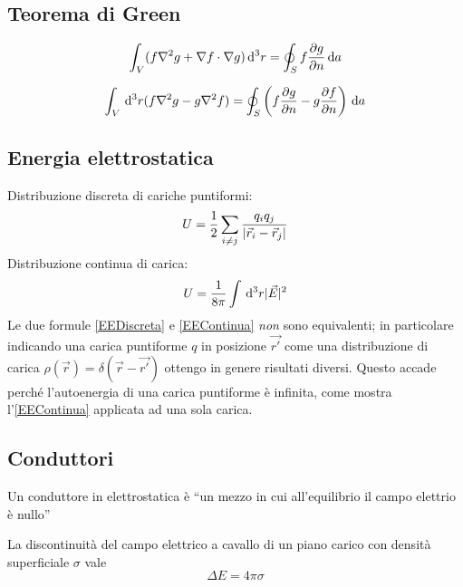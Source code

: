 \documentclass[../main.tex]{subfiles}
\begin{document}
\subsection{Teorema di Green}\label{Green}
\begin{theorem}
  \label{Green1}
  \begin{equation}
  \int_V (f \nabla^2 g + \nabla f \cdot \nabla g) \,\mathrm d^3 r = \oint_S f \frac{\partial g}{\partial n} \,\mathrm d a
  \end{equation}
\end{theorem}

\begin{theorem}
  \label{Green2}
  \begin{equation}
  \int_V \,\mathrm d^3 r (f \nabla^2 g - g \nabla^2 f) = \oint_S \left( f \frac{\partial g}{\partial n} - g \frac{\partial f}{\partial n} \right) \,\mathrm d a
  \end{equation}
\end{theorem}

\subsection{Energia elettrostatica}\label{EnergiaElettrostatica}
Distribuzione discreta di cariche puntiformi:
\begin{equation}
  \label{EEDiscreta}
  U= \frac{1}{2} \sum_{i\neq j} \frac{q_iq_j}{\lvert\vec r_i -\vec r_j\rvert}
\end{equation}
Distribuzione continua di carica:
\begin{equation}
  \label{EEContinua}
  U= \frac{1}{8\pi} \int \,\mathrm d^3 r \lvert\vec E\rvert^2
\end{equation}
Le due formule \cref{EEDiscreta} e \cref{EEContinua} \emph{non} sono equivalenti; in particolare indicando una carica puntiforme $q$ in posizione $\vec {r'}$ come una distribuzione di carica $\rho(\vec r)=\delta(\vec r - \vec {r'})$ ottengo in genere risultati diversi. Questo accade perch\'e l'autoenergia di una carica puntiforme \`e infinita, come mostra l'\cref{EEContinua} applicata ad una sola carica.

\subsection{Conduttori}\label{Conduttori}
\begin{definition}[Conduttore]
  Un conduttore in elettrostatica è ``un mezzo in cui all'equilibrio il campo elettrio è nullo'' 
\end{definition}
La discontinuità del campo elettrico a cavallo di un piano carico con densità superficiale $\sigma$ vale
\begin{equation}
  \label{DiscontinuitaSigma}
  \Delta E = 4 \pi \sigma
\end{equation}
\end{document}
